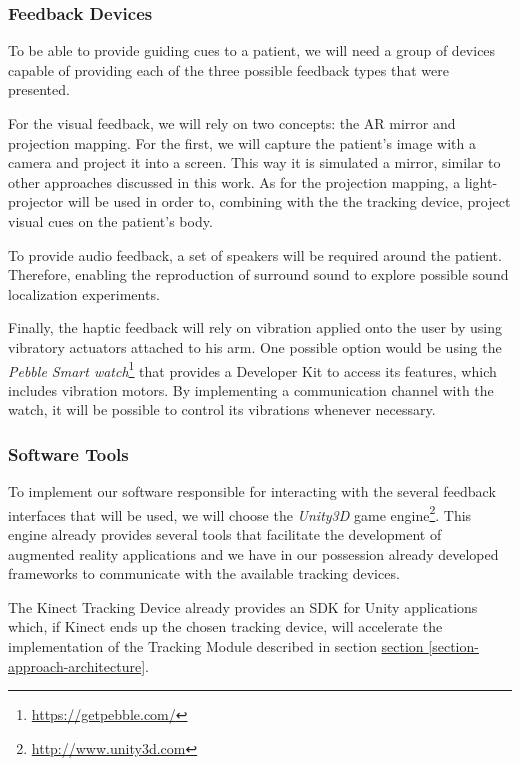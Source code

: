 \documentclass[runningheads]{llncs}
\begin{document}
\subsubsection{Feedback Devices}

To be able to provide guiding cues to a patient, we will need a group of devices capable of providing each of the three possible feedback types that were presented.

For the visual feedback, we will rely on two concepts: the \ac{AR} mirror and projection mapping. 
For the first, we will capture the patient's image with a camera and project it into a screen. 
This way it is simulated a mirror, similar to other approaches discussed in this work.
As for the projection mapping, a light-projector will be used in order to, combining with 
the the tracking device, project visual cues on the patient's body.

To provide audio feedback, a set of speakers will be required around the patient. 
Therefore, enabling the reproduction of surround sound to explore possible sound localization experiments.

Finally, the haptic feedback will rely on vibration applied onto the user by using 
vibratory actuators attached to his arm. 
One possible option would be using the \textit{Pebble Smart watch}\footnote{\url{https://getpebble.com/}} that 
provides a Developer Kit to access its features, which includes vibration motors. 
By implementing a communication channel with the watch, it will be possible to control its vibrations whenever necessary.

\subsubsection{Software Tools}

To implement our software responsible for interacting with the several feedback interfaces that 
will be used, we will choose the \emph{Unity3D} game engine\footnote{\url{http://www.unity3d.com}}. 
This engine already provides several tools that facilitate the development of augmented reality applications and we have in our possession already developed frameworks to communicate with the available tracking devices.

The Kinect Tracking Device already provides an SDK for Unity applications which, if Kinect ends up the chosen tracking device, will accelerate the implementation of the Tracking Module described in section \hyperref[section-approach-architecture]{section \ref{section-approach-architecture}}.
\end{document}
